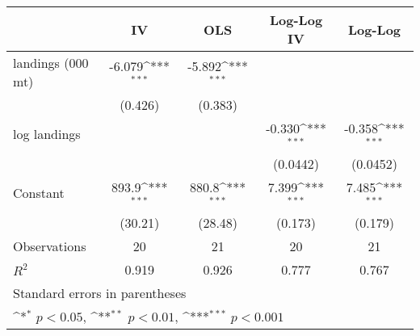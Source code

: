 {
\def\sym#1{\ifmmode^{#1}\else\(^{#1}\)\fi}
\begin{tabular}{l*{4}{c}}
\hline\hline
                &       IV         &      OLS         &Log-Log IV         &  Log-Log         \\
\hline
landings (000 mt)&   -6.079\sym{***}&   -5.892\sym{***}&                  &                  \\
                &  (0.426)         &  (0.383)         &                  &                  \\
[1em]
log landings    &                  &                  &   -0.330\sym{***}&   -0.358\sym{***}\\
                &                  &                  & (0.0442)         & (0.0452)         \\
[1em]
Constant        &    893.9\sym{***}&    880.8\sym{***}&    7.399\sym{***}&    7.485\sym{***}\\
                &  (30.21)         &  (28.48)         &  (0.173)         &  (0.179)         \\
\hline
Observations    &       20         &       21         &       20         &       21         \\
\(R^{2}\)       &    0.919         &    0.926         &    0.777         &    0.767         \\
\hline\hline
\multicolumn{5}{l}{\footnotesize Standard errors in parentheses}\\
\multicolumn{5}{l}{\footnotesize \sym{*} \(p<0.05\), \sym{**} \(p<0.01\), \sym{***} \(p<0.001\)}\\
\end{tabular}
}
